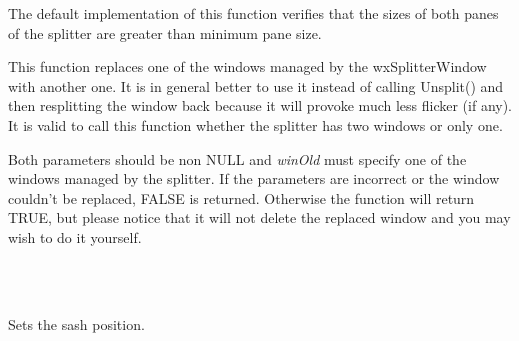 


The default implementation of this function verifies that the sizes of both 
panes of the splitter are greater than minimum pane size.

\label{wxsplitterwindowreplacewindow}


This function replaces one of the windows managed by the wxSplitterWindow with
another one. It is in general better to use it instead of calling Unsplit()
and then resplitting the window back because it will provoke much less flicker
(if any). It is valid to call this function whether the splitter has two
windows or only one.

Both parameters should be non NULL and {\it winOld} must specify one of the
windows managed by the splitter. If the parameters are incorrect or the window
couldn't be replaced, FALSE is returned. Otherwise the function will return
TRUE, but please notice that it will not delete the replaced window and you
may wish to do it yourself.




\\
\\

\label{wxsplitterwindowsetsashposition}


Sets the sash position.




